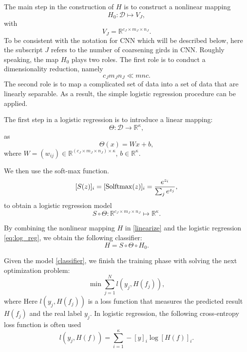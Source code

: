 The main step in the construction of $H$ is to 
construct a nonlinear mapping
\begin{equation}
\label{linearize}
H_0: {\mathcal D} \mapsto V_J,
\end{equation}
with 
\begin{equation}
\label{VJ}
V_J = \mathbb R^{c_J \times m_J\times n_J}. 
\end{equation}
To be consistent with the notation for CNN which will be described below,
here the subscript $J$ refers to the number of 
coarsening girds in CNN. 
Roughly speaking, the map $H_0$ plays two roles.  The first role
is to conduct a dimensionality reduction, namely
$$
c_Jm_Jn_J\ll  mnc.
$$
The second role is to map a complicated set of data into a set of data
that are linearly separable. As a result, the simple logistic regression 
procedure can be applied.

The first step in a logistic regression is to introduce a linear mapping:
\begin{equation*}
\Theta: {\mathcal D} \to\mathbb{R}^{\kappa} ,
\end{equation*}as 
\begin{equation}\label{thetamap}
\Theta(x)=Wx+b,
\end{equation}
where $W=(w_{ij})\in\mathbb{R}^{(c_J\times m_J \times n_J)\times \kappa}$, 
$b\in\mathbb{R}^{\kappa}$.


We then use the soft-max function.
\begin{equation}
\label{softmax}
[S(z)]_i=[{\rm Solftmax}(z)]_i= \frac{e^{z_i}}{\sum_{j} e^{z_j}},
\end{equation}
to obtain a logistic regression model 
\begin{equation}
\label{eq:log_reg}
S \circ \Theta: \mathbb R^{c_J \times m_J\times n_J}\mapsto \mathbb R^\kappa.
\end{equation}


By combining the nonlinear mapping $H$ in \eqref{linearize}
and the logistic regression \eqref{eq:log_reg}, we obtain the following classifier:
\begin{equation}
\label{classifier}
H=  S\circ \Theta\circ H_0.
\end{equation}

Given the model \eqref{classifier},
we finish the training phase with solving the next optimization 
problem:
\begin{equation}
\label{eq:3}
\min \sum_{j=1}^Nl(y_j, H(f_j)),
\end{equation}
where
Here $l(y_j, H(f_j))$ is a  loss function that measures the
predicted result $H(f_j)$ and the real label $y_j$. 
In logistic regression, 
the following cross-entropy loss function is often used
$$
l(y_j, H(f)) = \sum_{i=1}^\kappa -[y]_i \log [H(f)]_i.
$$